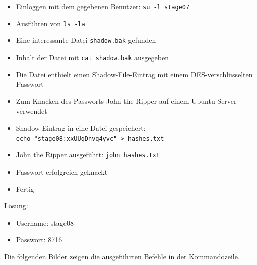 \documentclass[12pt, a4paper, titlepage, oneside]{scrartcl}
\begin{document}
	\begin{itemize}
		\item Einloggen mit dem gegebenen Benutzer: \lstinline{su -l stage07}

		\item Ausführen von \lstinline{ls -la}

		\item Eine interessante Datei \lstinline{shadow.bak} gefunden

		\item Inhalt der Datei mit \lstinline{cat shadow.bak} ausgegeben

		\item Die Datei enthielt einen Shadow-File-Eintrag mit einem DES-verschlüsselten
			Passwort

		\item Zum Knacken des Passworts John the Ripper auf einem Ubuntu-Server verwendet

		\item Shadow-Eintrag in eine Datei gespeichert: \\ \lstinline{echo "stage08:xxUUqDnvq4yvc" > hashes.txt}

		\item John the Ripper ausgeführt: \lstinline{john hashes.txt}

		\item Passwort erfolgreich geknackt

		\item Fertig
	\end{itemize}

	Lösung:
	\begin{itemize}
		\item Username: stage08

		\item Passwort: 8716
	\end{itemize}

	Die folgenden Bilder zeigen die ausgeführten Befehle in der Kommandozeile.
\end{document}

